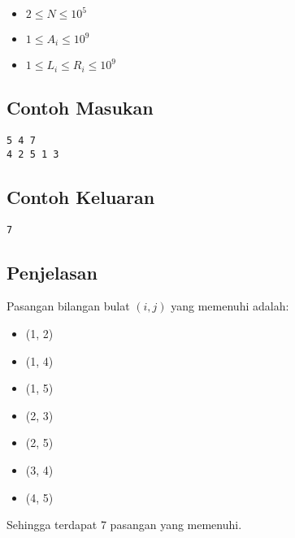 \documentclass{article}
\begin{document}
\begin{itemize}
    \item{$2 \leq N \leq 10^5$}
    \item{$1 \leq A_i \leq 10^9$}
    \item{$1 \leq L_i \leq R_i \leq 10^9$}
\end{itemize}

\begin{multicols}{2}
\subsection*{Contoh Masukan}
\begin{lstlisting}
5 4 7
4 2 5 1 3
\end{lstlisting}
\columnbreak
\subsection*{Contoh Keluaran}
\begin{lstlisting}
7
\end{lstlisting}
\vfill
\null
\end{multicols}

\subsection*{Penjelasan}

Pasangan bilangan bulat $(i, j)$ yang memenuhi adalah:
\begin{itemize}
    \item{(1, 2)}
    \item{(1, 4)}
    \item{(1, 5)}
    \item{(2, 3)}
    \item{(2, 5)}
    \item{(3, 4)}
    \item{(4, 5)}
\end{itemize}

Sehingga terdapat 7 pasangan yang memenuhi.
\end{document}
